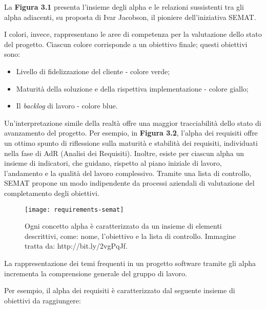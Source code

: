 \newpage 

La \textbf{Figura 3.1} presenta l'insieme degli alpha e le relazioni 
sussistenti tra gli alpha adiacenti, su proposta di Ivar Jacobson, 
il pioniere dell'iniziativa SEMAT. 
 
I colori, invece, rappresentano le aree di competenza per la valutazione 
dello stato del progetto. Ciascun colore corrisponde a un obiettivo finale; 
questi obiettivi sono: 

\begin{itemize}
	\item Livello di fidelizzazione del cliente - colore verde;
	\item Maturità della soluzione e della rispettiva implementazione - colore giallo;
	\item Il \textit{backlog} di lavoro - colore blue.
\end{itemize}

Un'interpretazione simile della realtà offre una maggior 
tracciabilità dello stato di avanzamento del progetto. 
Per esempio, in \textbf{Figura 3.2}, l'alpha dei requisiti  
offre un ottimo spunto di riflessione sulla maturità e 
stabilità dei requisiti, individuati nella fase di AdR 
(Analisi dei Requisiti). 
Inoltre, esiste per ciascun alpha un insieme di indicatori, 
che guidano, rispetto al piano iniziale di lavoro, l'andamento 
e la qualità del lavoro complessivo. 
Tramite una lista di controllo, SEMAT propone un modo indipendente 
da processi aziendali di valutazione 
del completamento degli obiettivi.

\begin{figure}[htbp]
	\begin{center}
		\texttt{[image: requirements-semat]}
		\caption{Ogni concetto alpha è caratterizzato da un 
			     insieme di elementi descrittivi, come: nome, 
			     l'obiettivo e la lista di controllo. Immagine tratta 
				 da: http://bit.ly/2vgPqJf.}
	\end{center}
\end{figure}  

La rappresentazione dei temi frequenti in un progetto 
software tramite gli alpha incrementa la comprensione
generale del gruppo di lavoro.

Per esempio, il alpha dei requisiti è caratterizzato 
dal seguente insieme di obiettivi da raggiungere:

